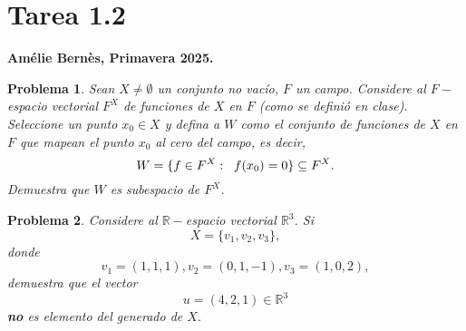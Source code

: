 \documentclass[10pt]{extreport}
\newcommand*{\IR}{\mathbb{R}}
\newtheorem{prob}{Problema}
\begin{document}
\newpage

\section{Tarea 1.2}
\begin{flushright}
	\textbf{Amélie Bernès, Primavera 2025.}
\end{flushright}


\begin{prob}
	Sean $X \neq \emptyset$ un conjunto no vacío, $F$ un campo. 
	Considere al
	$F-$espacio vectorial 
	$F^X$ de funciones de $X$ en $F$ (como se definió en clase).
	Seleccione un punto $x_{0} \in X$ y defina a $W$
	como el conjunto de funciones de $X$ en $F$ que mapean el punto
	$x_{0}$ al cero del campo, es decir, 
	\[
	 W = \{ f \in F^X : \hspace{0.2cm} f(x_{0}) = 0 \} \subseteq F^X.
	\]
	Demuestra que $W$ es subespacio de $F^X$.
\end{prob}


\begin{prob}
	Considere al $\IR-$espacio vectorial $\IR^{3}$.
	Si
	\[
	 X = \{ v_{1}, v_{2}, v_{3} \}, 
	\]
	donde
	\[
	v_{1} = (1, 1, 1), v_{2} = (0, 1, -1), v_{3} = (1, 0, 2),
	\]
	demuestra que el vector 
	\[
	u = (4, 2, 1) \in \IR^{3}
	\]
	\textbf{no} es elemento del generado de $X$.
\end{prob}
\end{document}
